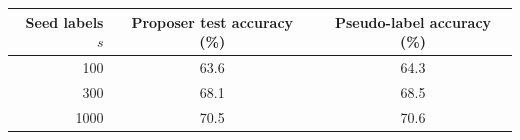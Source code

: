 \begin{tabular}{rcc}
\toprule
Seed labels $s$ & Proposer test accuracy (\%) & Pseudo-label accuracy (\%) \\
\midrule
100 & 63.6 & 64.3 \\
300 & 68.1 & 68.5 \\
1000 & 70.5 & 70.6 \\
\bottomrule
\end{tabular}
